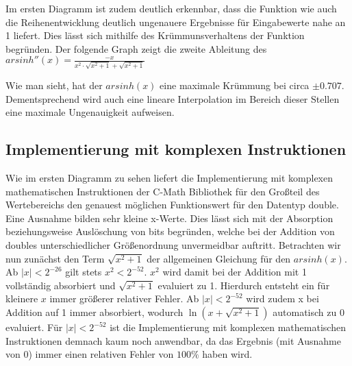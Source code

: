 \documentclass[course=erap] {aspdoc}
\begin{document}
    Im ersten Diagramm ist zudem deutlich erkennbar, dass die Funktion wie auch die Reihenentwicklung deutlich ungenauere Ergebnisse für Eingabewerte nahe an 1 liefert. Dies lässt sich mithilfe des Krümmunsverhaltens der Funktion begründen. Der folgende Graph zeigt die zweite Ableitung des $arsinh''(x) = \frac{-x}{x^2\cdot \sqrt{x^2+1}+\sqrt{x^2+1}}$

    

    Wie man sieht, hat der $arsinh(x)$ eine maximale Krümmung bei circa $\pm 0.707$. Dementsprechend wird auch eine lineare Interpolation im Bereich dieser Stellen eine maximale Ungenauigkeit aufweisen.
    
    \subsection{Implementierung mit komplexen Instruktionen}
    Wie im ersten Diagramm zu sehen liefert die Implementierung mit komplexen mathematischen Instruktionen der C-Math Bibliothek für den Großteil des Wertebereichs den genauest möglichen Funktionswert für den Datentyp double. Eine Ausnahme bilden sehr kleine x-Werte. Dies lässt sich mit der Absorption beziehungsweise Auslöschung von bits begründen, welche bei der Addition von doubles unterschiedlicher Größenordnung unvermeidbar auftritt. Betrachten wir nun zunächst den Term $\sqrt{x^2 + 1}$ der allgemeinen Gleichung für den $arsinh(x)$. Ab $|x|<2^{-26}$ gilt stets $x^2<2^{-52}$. $x^2$ wird damit bei der Addition mit 1 vollständig absorbiert und $\sqrt{x^2 + 1}$ evaluiert zu 1. Hierdurch entsteht ein für kleinere $x$ immer größerer relativer Fehler. Ab $|x|<2^{-52}$ wird zudem x bei Addition auf 1 immer absorbiert, wodurch $\ln{(x+\sqrt{x^2 + 1})}$ automatisch zu 0 evaluiert. Für $|x|<2^{-52}$ ist die Implementierung mit komplexen mathematischen Instruktionen demnach kaum noch anwendbar, da das Ergebnis (mit Ausnahme von 0) immer einen relativen Fehler von $100\%$ haben wird.
    
\end{document}

